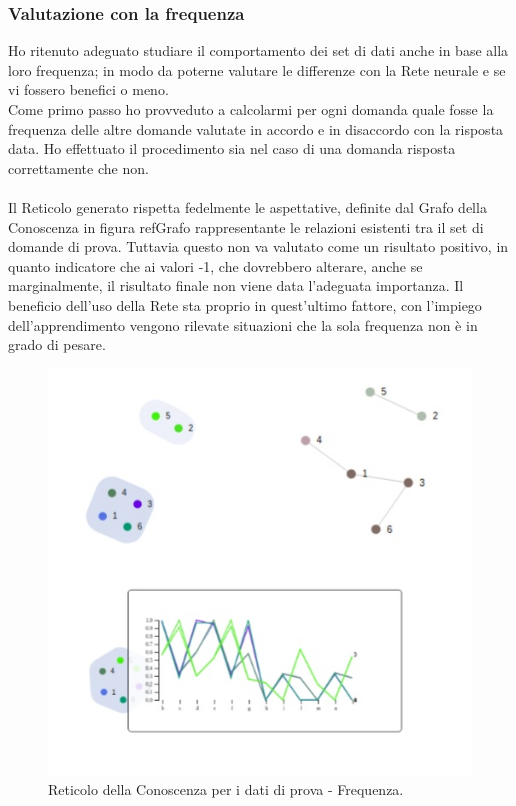 \subsubsection{Valutazione con la frequenza}
\label{Valutazione con la frequenza}
Ho ritenuto adeguato studiare il comportamento dei set di dati anche in base alla loro frequenza; in modo da poterne valutare le differenze con la Rete neurale e se vi fossero benefici o meno.\\
Come primo passo ho provveduto a calcolarmi per ogni domanda quale fosse la frequenza delle altre domande valutate in accordo e in disaccordo con la risposta data. Ho effettuato il procedimento sia nel caso di una domanda risposta correttamente che non.\\\\
\noindent
Il Reticolo generato rispetta fedelmente le aspettative, definite dal Grafo della Conoscenza in figura ref{Grafo rappresentante le relazioni esistenti tra il set di domande di prova}. Tuttavia questo non va valutato come un risultato positivo, in quanto indicatore che ai valori -1, che dovrebbero alterare, anche se marginalmente, il risultato finale non viene data l'adeguata importanza. Il beneficio dell'uso della Rete sta proprio in quest'ultimo fattore, con l'impiego dell'apprendimento vengono rilevate situazioni che la sola frequenza non \`e in grado di pesare.

\begin{figure}[H]
\centering
	\includegraphics[width=0.50\linewidth]{./image/collage_reticolo-general-FREQ.png}
	\caption{Reticolo della Conoscenza per i dati di prova - Frequenza.}
	\label{Reticolo della Conoscenza per i dati di prova - Frequenza.}
\end{figure}
\noindent


